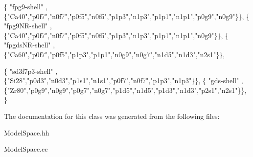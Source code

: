 \begin{DoxyCode}
\{ \textcolor{stringliteral}{"fpg9-shell"}  ,      \{\textcolor{stringliteral}{"Ca40"},\textcolor{stringliteral}{"p0f7"},\textcolor{stringliteral}{"n0f7"},\textcolor{stringliteral}{"p0f5"},\textcolor{stringliteral}{"n0f5"},\textcolor{stringliteral}{"p1p3"},\textcolor{stringliteral}{"n1p3"},\textcolor{stringliteral}{"p1p1"},\textcolor{stringliteral}{"n1p1"},\textcolor{stringliteral}{"p0g9"},\textcolor{stringliteral}{"n0g9"}\}\},
\{ \textcolor{stringliteral}{"fpg9NR-shell"}  ,    \{\textcolor{stringliteral}{"Ca40"},\textcolor{stringliteral}{"p0f7"},\textcolor{stringliteral}{"n0f7"},\textcolor{stringliteral}{"p0f5"},\textcolor{stringliteral}{"n0f5"},\textcolor{stringliteral}{"p1p3"},\textcolor{stringliteral}{"n1p3"},\textcolor{stringliteral}{"p1p1"},\textcolor{stringliteral}{"n1p1"},\textcolor{stringliteral}{"n0g9"}\}\}, 
\{ \textcolor{stringliteral}{"fpgdsNR-shell"}  ,   \{\textcolor{stringliteral}{"Ca60"},\textcolor{stringliteral}{"p0f7"},\textcolor{stringliteral}{"p0f5"},\textcolor{stringliteral}{"p1p3"},\textcolor{stringliteral}{"p1p1"},\textcolor{stringliteral}{"n0g9"},\textcolor{stringliteral}{"n0g7"},\textcolor{stringliteral}{"n1d5"},\textcolor{stringliteral}{"n1d3"},\textcolor{stringliteral}{"n2s1"}\}\}, 

\{ \textcolor{stringliteral}{"sd3f7p3-shell"}  ,   \{\textcolor{stringliteral}{"Si28"},\textcolor{stringliteral}{"p0d3"},\textcolor{stringliteral}{"n0d3"},\textcolor{stringliteral}{"p1s1"},\textcolor{stringliteral}{"n1s1"},\textcolor{stringliteral}{"p0f7"},\textcolor{stringliteral}{"n0f7"},\textcolor{stringliteral}{"p1p3"},\textcolor{stringliteral}{"n1p3"}\}\},
\{ \textcolor{stringliteral}{"gds-shell"} ,        \{\textcolor{stringliteral}{"Zr80"},\textcolor{stringliteral}{"p0g9"},\textcolor{stringliteral}{"n0g9"},\textcolor{stringliteral}{"p0g7"},\textcolor{stringliteral}{"n0g7"},\textcolor{stringliteral}{"p1d5"},\textcolor{stringliteral}{"n1d5"},\textcolor{stringliteral}{"p1d3"},\textcolor{stringliteral}{"n1d3"},\textcolor{stringliteral}{"p2s1"},\textcolor{stringliteral}{"n2s1"}\}\}, 
\}
\end{DoxyCode}


The documentation for this class was generated from the following files\+:\begin{DoxyCompactItemize}
\item 
Model\+Space.\+hh\item 
Model\+Space.\+cc\end{DoxyCompactItemize}

